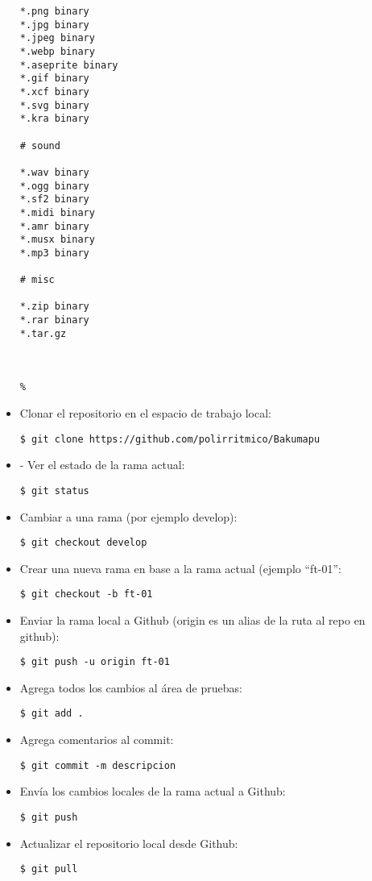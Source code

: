 \begin{itemize}[label=-]
\begin{minipage}{.45\textwidth}
\begin{lstlisting}[escapechar=\%]
*.png binary
*.jpg binary
*.jpeg binary
*.webp binary
*.aseprite binary
*.gif binary
*.xcf binary
*.svg binary
*.kra binary

# sound

*.wav binary
*.ogg binary
*.sf2 binary
*.midi binary
*.amr binary
*.musx binary
*.mp3 binary

# misc

*.zip binary
*.rar binary
*.tar.gz



%
	\end{lstlisting}
	\end{minipage}

	\item Clonar el repositorio en el espacio de trabajo local:
	\begin{lstlisting}
$ git clone https://github.com/polirritmico/Bakumapu
	\end{lstlisting}

	\item - Ver el estado de la rama actual:
	\begin{lstlisting}
$ git status
	\end{lstlisting}
	
	\item Cambiar a una rama (por ejemplo develop):
	\begin{lstlisting}
$ git checkout develop
	\end{lstlisting}
	
	\item Crear una nueva rama en base a la rama actual (ejemplo “ft-01”:
	\begin{lstlisting}
$ git checkout -b ft-01
	\end{lstlisting}
	
	\item Enviar la rama local a Github (origin es un alias de la ruta al repo en github):
	\begin{lstlisting}
$ git push -u origin ft-01
	\end{lstlisting}
	
	\item Agrega todos los cambios al área de pruebas:
	\begin{lstlisting}
$ git add .
	\end{lstlisting}
	
	\item Agrega comentarios al commit:
	\begin{lstlisting}
$ git commit -m descripcion
	\end{lstlisting}
	
	\item Envía los cambios locales de la rama actual a Github:
	\begin{lstlisting}
$ git push
	\end{lstlisting}
	
	\item Actualizar el repositorio local desde Github:
	\begin{lstlisting}
$ git pull
	\end{lstlisting}
\end{itemize}

